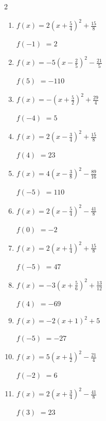 \begin{multicols}{2}
\begin{enumerate}
\columnbreak %

  \item $\displaystyle f(x)=2\left( x+\frac{5}{4}\right)^{2}+\frac{15}{8}$

$f(-1)$
        $=2$

  \item $\displaystyle f(x)=-5\left( x-\frac{2}{5}\right)^{2}-\frac{21}{5}$

$f(5)$
        $=-110$

  \item $\displaystyle f(x)=-\left( x+\frac{5}{2}\right)^{2}+\frac{29}{4}$

$f(-4)$
        $=5$

  \item $\displaystyle f(x)=2\left( x-\frac{3}{4}\right)^{2}+\frac{15}{8}$

$f(4)$
        $=23$

  \item $\displaystyle f(x)=4\left( x-\frac{3}{8}\right)^{2}-\frac{89}{16}$

$f(-5)$
        $=110$

\columnbreak %

\resetques

  \item $\displaystyle f(x)=2\left( x-\frac{5}{4}\right)^{2}-\frac{41}{8}$

$f(0)$
        $=-2$

  \item $\displaystyle f(x)=2\left( x+\frac{1}{4}\right)^{2}+\frac{15}{8}$

$f(-5)$
        $=47$

  \item $\displaystyle f(x)=-3\left( x+\frac{5}{6}\right)^{2}+\frac{13}{12}$

$f(4)$
        $=-69$

  \item $\displaystyle f(x)=-2\left( x+1\right)^{2}+5$

$f(-5)$
        $=-27$

  \item $\displaystyle f(x)=5\left( x+\frac{1}{2}\right)^{2}-\frac{21}{4}$

$f(-2)$
        $=6$

\columnbreak %

  \item $\displaystyle f(x)=2\left( x+\frac{3}{4}\right)^{2}-\frac{41}{8}$

$f(3)$
        $=23$


\end{enumerate}
\end{multicols}
